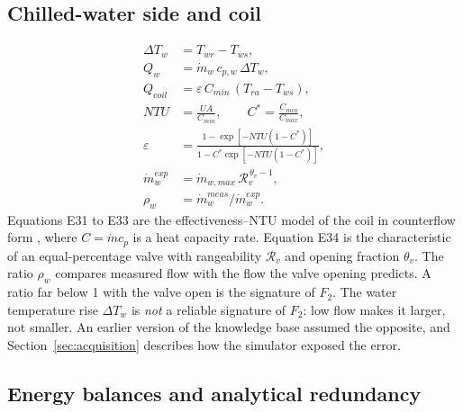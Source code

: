 \subsection{Chilled-water side and coil}

\begin{align}
  \Delta T_w &= T_{wr} - T_{ws} , \tag{E29}\\
  Q_w &= \dot m_w\, c_{p,w}\, \Delta T_w , \tag{E30}\\
  Q_{coil} &= \varepsilon\, C_{min}\, (T_{ra} - T_{ws}) , \tag{E31}\\
  \mathit{NTU} &= \frac{UA}{C_{min}} , \qquad C^{*} = \frac{C_{min}}{C_{max}} , \tag{E32}\\
  \varepsilon &= \frac{1 - \exp[-\mathit{NTU}(1 - C^{*})]}{1 - C^{*}\exp[-\mathit{NTU}(1 - C^{*})]} , \tag{E33}\\
  \dot m_w^{exp} &= \dot m_{w,max}\, \mathcal{R}_v^{\,\theta_v - 1} , \tag{E34}\\
  \rho_w &= \dot m_w^{meas} / \dot m_w^{exp} . \tag{E34a}
\end{align}
Equations E31 to E33 are the effectiveness--NTU model of the coil in counterflow form \parencite{incropera2011}, where $C = \dot m c_p$ is a heat capacity rate. Equation E34 is the characteristic of an equal-percentage valve with rangeability $\mathcal{R}_v$ and opening fraction $\theta_v$. The ratio $\rho_w$ compares measured flow with the flow the valve opening predicts. A ratio far below 1 with the valve open is the signature of $F_2$. The water temperature rise $\Delta T_w$ is \emph{not} a reliable signature of $F_2$: low flow makes it larger, not smaller. An earlier version of the knowledge base assumed the opposite, and Section~\ref{sec:acquisition} describes how the simulator exposed the error.

\subsection{Energy balances and analytical redundancy}
\label{sec:balances}

